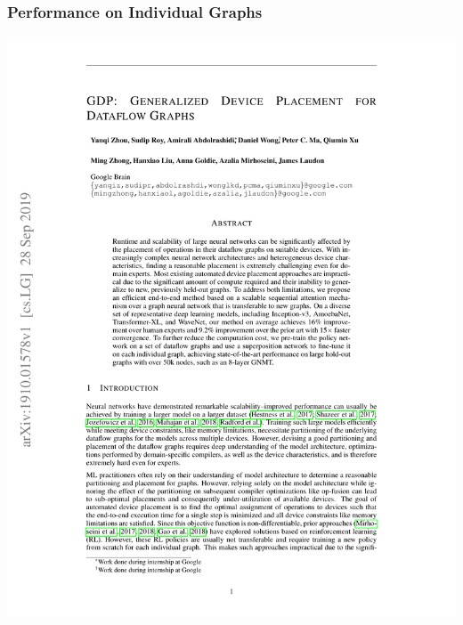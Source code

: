 \documentclass[12pt,aspectratio=169]{beamer}
\begin{document}
    \begin{frame}
        \frametitle{Performance on Individual Graphs}

        \centering
        \includegraphics[page=6,trim=3cm 15cm 3cm 5cm,clip,scale=.88]{GDP.pdf}
    \end{frame}
\end{document}
